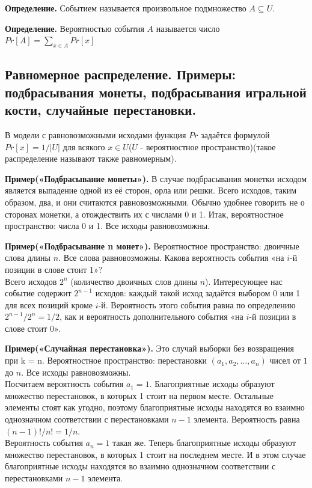 \documentclass[a4paper, 10pt]{article}
\begin{document}
\textbf{Определение.} Событием называется произвольное подмножество $A \subseteq U$.

\textbf{Определение.} Вероятностью события $A$ называется число $Pr[A] = \sum_{x \in A} Pr[x]$

\subsection{Равномерное распределение. Примеры: подбрасывания монеты, подбрасывания игральной кости, случайные перестановки.}

В модели с равновозможными исходами функция $Pr$ задаётся формулой $Pr[x] = 1/|U|$ для всякого $x \in U$($U$ -  вероятностное пространство)(такое распределение называют также равномерным).

\textbf{Пример(«Подбрасывание монеты»).} В случае подбрасывания монетки исходом является выпадение одной из её сторон, орла или решки. Всего исходов, таким образом, два, и они считаются равновозможными. Обычно удобнее говорить не о сторонах монетки, а отождествить их с числами 0 и 1.
Итак, вероятностное пространство: числа 0 и 1. Все исходы равновозможны.

\textbf{Пример(«Подбрасывание n монет»).} Вероятностное пространство: двоичные слова длины $n$. Все слова равновозможны. Какова вероятность события «на $i$-й позиции в слове стоит 1»?\\
Всего исходов $2^n$ (количество двоичных слов длины $n$). Интересующее нас событие содержит $2^{n-1}$ исходов: каждый такой исход задаётся выбором 0 или 1 для всех позиций кроме $i$-й. Вероятность этого события равна по определению $2^{n-1} / 2^n = 1/2$, как и вероятность дополнительного события «на $i$-й позиции в слове стоит 0».

\textbf{Пример(«Случайная перестановка»).} Это случай выборки без возвращения при k = n. Вероятностное пространство: перестановки $(a_1, a_2, \dots , a_n)$ чисел от $1$ до $n$. Все исходы равновозможны. \\
Посчитаем вероятность события $a_1 = 1$. Благоприятные исходы образуют множество перестановок, в которых 1 стоит на первом месте. Остальные элементы стоят как угодно, поэтому благоприятные исходы находятся во взаимно однозначном соответствии с перестановками $n - 1$ элемента. Вероятность равна $(n - 1)!/n! = 1/n$. \\
Вероятность события $a_n = 1$ такая же. Теперь благоприятные исходы образуют множество перестановок, в которых 1 стоит на последнем месте. И в этом случае благоприятные исходы находятся во взаимно однозначном соответствии с перестановками $n - 1$ элемента.
\end{document}
